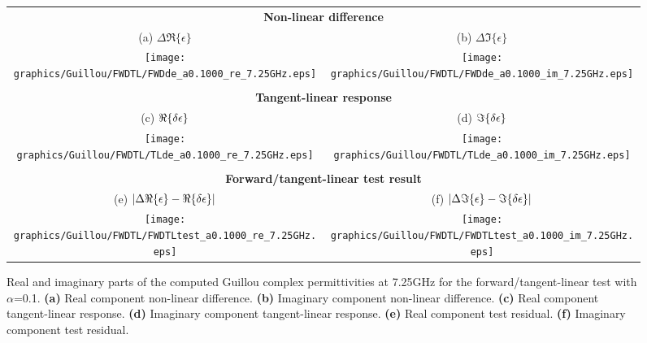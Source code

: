 \begin{figure}[htp]
  \centering
  \begin{tabular}{c c}
    \multicolumn{2}{c}{\sffamily\textbf{Non-linear difference}}\\
    \textsf{(a)} $\Delta\Re\{\epsilon\}$ &
    \textsf{(b)} $\Delta\Im\{\epsilon\}$ \\
    \hspace{1.0em}\texttt{[image: graphics/Guillou/FWDTL/FWDde\_a0.1000\_re\_7.25GHz.eps]} &
    \texttt{[image: graphics/Guillou/FWDTL/FWDde\_a0.1000\_im\_7.25GHz.eps]} \\\\
    \multicolumn{2}{c}{\sffamily\textbf{Tangent-linear response}}\\
    \textsf{(c)} $\Re\{\delta\epsilon\}$ &
    \textsf{(d)} $\Im\{\delta\epsilon\}$ \\
    \hspace{1.0em}\texttt{[image: graphics/Guillou/FWDTL/TLde\_a0.1000\_re\_7.25GHz.eps]} &
    \texttt{[image: graphics/Guillou/FWDTL/TLde\_a0.1000\_im\_7.25GHz.eps]} \\\\
    \multicolumn{2}{c}{\sffamily\textbf{Forward/tangent-linear test result}}\\
    \textsf{(e)} $|\Delta\Re\{\epsilon\} - \Re\{\delta\epsilon\}|$ &
    \textsf{(f)} $|\Delta\Im\{\epsilon\} - \Im\{\delta\epsilon\}|$ \\
    \texttt{[image: graphics/Guillou/FWDTL/FWDTLtest\_a0.1000\_re\_7.25GHz.eps]} & 
    \texttt{[image: graphics/Guillou/FWDTL/FWDTLtest\_a0.1000\_im\_7.25GHz.eps]}
  \end{tabular}
  \caption{Real and imaginary parts of the computed Guillou complex permittivities at 7.25GHz for the forward/tangent-linear test with $\alpha$=0.1. \textbf{(a)} Real component non-linear difference.  \textbf{(b)} Imaginary component non-linear difference. \textbf{(c)} Real component tangent-linear response. \textbf{(d)} Imaginary component tangent-linear response. \textbf{(e)} Real component test residual. \textbf{(f)} Imaginary component test residual.}
  \label{fig:fwdtl_a0.1000_guillou}
\end{figure}

